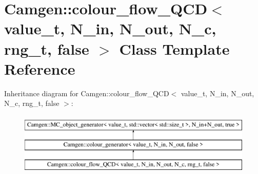 \hypertarget{a00080}{\section{Camgen\-:\-:colour\-\_\-flow\-\_\-\-Q\-C\-D$<$ value\-\_\-t, N\-\_\-in, N\-\_\-out, N\-\_\-c, rng\-\_\-t, false $>$ Class Template Reference}
\label{a00080}
}
Inheritance diagram for Camgen\-:\-:colour\-\_\-flow\-\_\-\-Q\-C\-D$<$ value\-\_\-t, N\-\_\-in, N\-\_\-out, N\-\_\-c, rng\-\_\-t, false $>$\-:\begin{figure}[H]
\begin{center}
\leavevmode
\includegraphics[height=3.000000cm]{a00080}
\end{center}
\end{figure}
